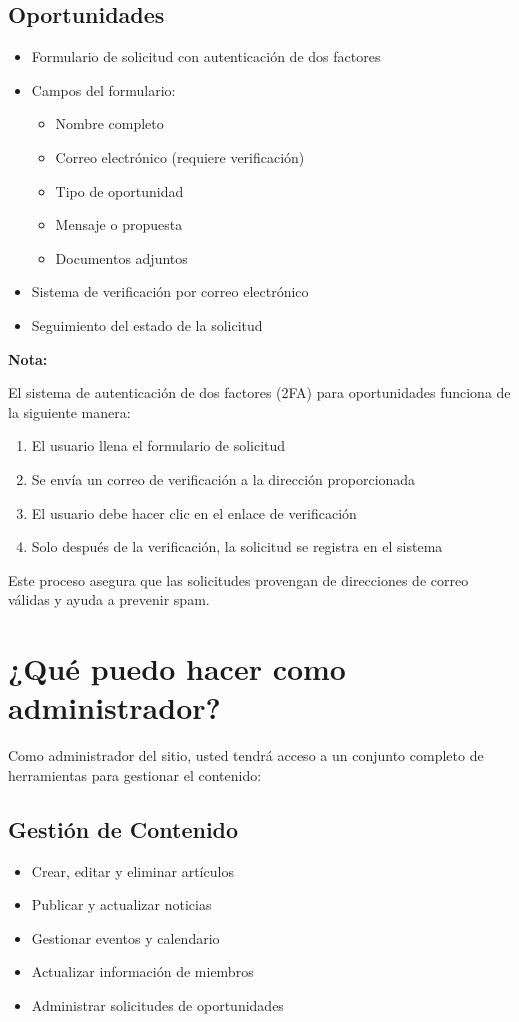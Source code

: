 \documentclass[12pt,letterpaper]{report}
\newenvironment{note}
    {\begin{mdframed}[linecolor=note-blue,linewidth=2pt,backgroundcolor=note-blue!10]
    \textbf{Nota:}\par}
    {\end{mdframed}}
\begin{document}
\subsection{Oportunidades}
\begin{itemize}
    \item Formulario de solicitud con autenticación de dos factores
    \item Campos del formulario:
        \begin{itemize}
            \item Nombre completo
            \item Correo electrónico (requiere verificación)
            \item Tipo de oportunidad
            \item Mensaje o propuesta
            \item Documentos adjuntos
        \end{itemize}
    \item Sistema de verificación por correo electrónico
    \item Seguimiento del estado de la solicitud
\end{itemize}

\begin{note}
El sistema de autenticación de dos factores (2FA) para oportunidades funciona de la siguiente manera:
\begin{enumerate}
    \item El usuario llena el formulario de solicitud
    \item Se envía un correo de verificación a la dirección proporcionada
    \item El usuario debe hacer clic en el enlace de verificación
    \item Solo después de la verificación, la solicitud se registra en el sistema
\end{enumerate}
Este proceso asegura que las solicitudes provengan de direcciones de correo válidas y ayuda a prevenir spam.
\end{note}

\section{¿Qué puedo hacer como administrador?}
Como administrador del sitio, usted tendrá acceso a un conjunto completo de herramientas para gestionar el contenido:

\subsection{Gestión de Contenido}
\begin{itemize}
    \item Crear, editar y eliminar artículos
    \item Publicar y actualizar noticias
    \item Gestionar eventos y calendario
    \item Actualizar información de miembros
    \item Administrar solicitudes de oportunidades
\end{itemize}
\end{document}
